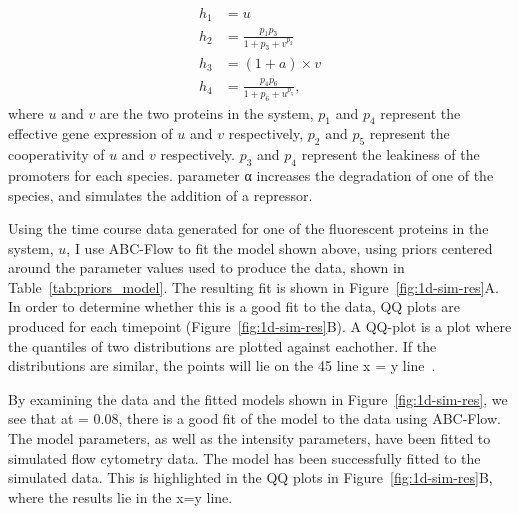 \begin{align}
h_1 &= u \label{eq:eg1}\\
h_2 &= \frac{p_1  p_3	}{1+p_3+v^{p_2}} \label{eq:eg2}\\
h_3 &= (1 + a)\times v \label{eq:eg3}\\
h_4 &= \frac{p_4 p_6}{1+p_6+u^{p_5}} \label{eq:eg4},
\end{align}
where $u$ and $v$ are the two proteins in the system, $p_1$ and $p_4$ represent the effective gene expression of $u$ and $v$ respectively, $p_2$ and $p_5$ represent the cooperativity of $u$ and $v$ respectively. $p_3$ and $p_4$ represent the leakiness of the promoters for each species. parameter α increases the degradation of one of the species, and simulates the addition of a repressor.



Using the time course data generated for one of the fluorescent proteins in the system, $u$, I use ABC-Flow to fit the model shown above, using priors centered around the parameter values used to produce the data, shown in Table~\ref{tab:priors_model}. The resulting fit is shown in Figure~\ref{fig:1d-sim-res}A. In order to determine whether this is a good fit to the data, QQ plots are produced for each timepoint (Figure~\ref{fig:1d-sim-res}B). A QQ-plot is a plot where the quantiles of two distributions are plotted against eachother. If the distributions are similar, the points will lie on the 45\textdegree{} line x = y line~\autocite{Wilk:1968ts}. 

By examining the data and the fitted models shown in Figure~\ref{fig:1d-sim-res}, we see that at \textepsilon = 0.08, there is a good fit of the model to the data using ABC-Flow. The model parameters, as well as the intensity parameters, have been fitted to simulated flow cytometry data. The model has been successfully fitted to the simulated data. This is highlighted in the QQ plots in Figure~\ref{fig:1d-sim-res}B, where the results lie in the x=y line. 

